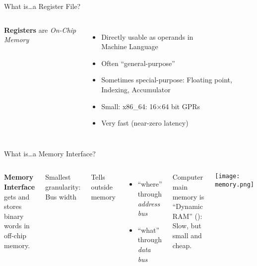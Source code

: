 \documentclass[english,compress]{beamer}
\begin{document}
\begin{frame}{What is\dots a Register File?}
  \begin{columns}
      \textbf{Registers} are \emph{On-Chip Memory}

      \begin{itemize}
        \item
        Directly usable as operands in\\
        Machine Language

        \item
        Often ``general-purpose''

        \item
        Sometimes special-purpose: Floating point, Indexing,
        Accumulator

        \item
        Small: x86\_64: 16$\times$64 bit GPRs

        \item Very fast (near-zero latency)
      \end{itemize}

  \end{columns}
  \uncover<+>{}
\end{frame}

\begin{frame}{What is\dots a Memory Interface?}
  \begin{columns}
      \textbf{Memory Interface} gets and stores binary words in
      off-chip memory.
      \medskip

      Smallest granularity: Bus width
      \medskip

      Tells outside memory
      \begin{itemize}
        \item ``where'' through \emph{address bus}
        \item ``what'' through \emph{data bus}
      \end{itemize}

      Computer main memory is ``Dynamic RAM''
      ():
      Slow, but small and cheap.

      \texttt{[image: memory.png]}
  \end{columns}
\end{frame}
\end{document}
